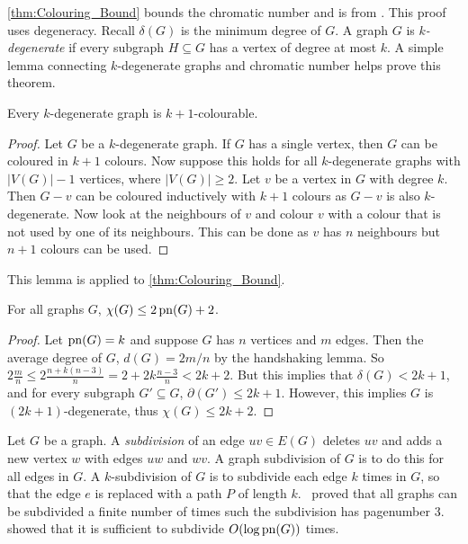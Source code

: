 \cref{thm:Colouring_Bound} bounds the chromatic number and is from \textcite{bernhartBookThicknessGraph1979}. This proof uses degeneracy. Recall $\delta(G)$ is the minimum degree of $G$. A graph $G$ is \textit{$k$-degenerate} if every subgraph $H \subseteq G$ has a vertex of degree at most $k$. 
A simple lemma connecting $k$-degenerate graphs and chromatic number helps prove this theorem. 
\begin{lemma}
	Every $k$-degenerate graph is $k + 1$-colourable.
\end{lemma}
\begin{proof}
	Let $G$ be a $k$-degenerate graph. If $G$ has a single vertex, then $G$ can be coloured in $k + 1$ colours. Now suppose this holds for all $k$-degenerate graphs with $|V(G)|- 1$ vertices, where $|V(G)| \geq 2$. Let $v$ be a vertex in $G$ with degree $k$. Then $G - v$ can be coloured inductively with $k + 1$ colours as $G - v$ is also $k$-degenerate. Now look at the neighbours of $v$ and colour $v$ with a colour that is not used by one of its neighbours. This can be done as $v$ has $n$ neighbours but $n + 1$ colours can be used. 
\end{proof}

This lemma is applied to \cref{thm:Colouring_Bound}. 

\begin{proposition}\label{thm:Colouring_Bound}
	For all graphs \(G\), \(\chi(G) \leq 2 \operatorname{pn}(G) + 2\).
\end{proposition}
\begin{proof}
	Let \(\operatorname{pn}(G) = k\) and suppose \(G\) has \(n\) vertices and \(m\) edges. Then the average degree of \(G\), \(d(G) = 2m/n\) by the handshaking lemma. So \(2\frac{m}{n} \leq 2 \frac{n + k(n-3)}{n} = 2 + 2k \frac{n-3}{n} < 2k + 2\). But this implies that \(\delta(G) < 2k + 1\), and for every subgraph $G' \subseteq G$, \(\partial(G') \leq 2k + 1\). However, this implies \(G\) is \((2k + 1)\)-degenerate, thus \(\chi(G) \leq 2k + 2\).
\end{proof}

Let $G$ be a graph. A \textit{subdivision} of an edge $uv \in E(G)$ deletes $uv$ and adds a new vertex $w$ with edges $uw$ and $wv$. A graph subdivision of $G$ is to do this for all edges in $G$. A $k$-subdivision of $G$ is to subdivide each edge $k$ times in $G$, so that the edge $e$ is replaced with a path $P$ of length $k$.\ \textcite{atneosenEmbeddabilityCompactaNbooks} proved that all graphs can be subdivided a finite number of times such the subdivision has pagenumber 3.\ \textcite{dujmovicLayoutsGraphSubdivisions2005} showed that it is sufficient to subdivide $O(\log\operatorname{pn}(G))$ times. 

